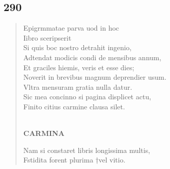 \documentclass[11pt, a4paper]{report}
\begin{document}
            \subsection*{290}
      \begin{verse}
      Epigrmmatae parva uod in hoc \\ Iibro sceripserit \\ Si quis boc nostro detrahit ingenio, \\ Adtendat modicis condi  \lbrack de \rbrack  mensibus annum, \\ Et graciles hiemis, veris et esse dies; \\ Noverit  \lbrack in \rbrack  brevibus magnum deprendier usum. \\ Vltra mensuram gratia nulla datur. \\ Sic mea concinno si pagina displicet actu, \\ Finito citius carmine clausa silet. \\ 
        ﻿\pagebreak 
     \marginpar{[250]} \begin{center} \textbf{CARMINA} \end{center}Nam si constaret libris longissima multis, \\ Fstidita forent plurima †vel vitio. \\ 
      \end{verse}
  
\end{document}
